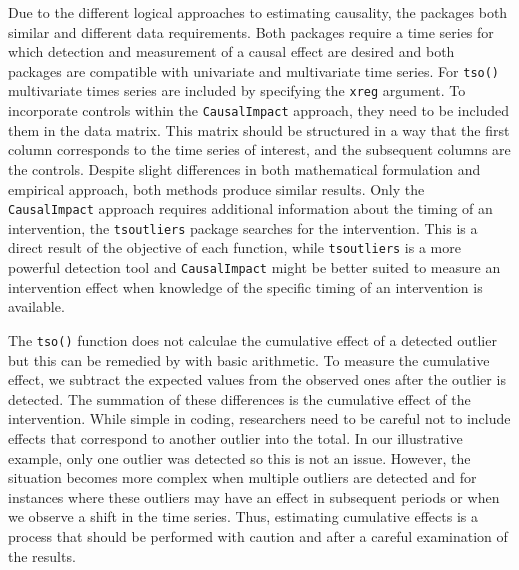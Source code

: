 \documentclass[12pt]{article}
\begin{document}
Due to the different logical approaches to estimating causality, the
packages both similar and different data requirements. Both packages
require a time series for which detection and measurement of a causal
effect are desired and both packages are compatible with univariate and
multivariate time series. For \texttt{tso()} multivariate times series
are included by specifying the \texttt{xreg} argument. To incorporate
controls within the \texttt{CausalImpact} approach, they need to be
included them in the data matrix. This matrix should be structured in a
way that the first column corresponds to the time series of interest,
and the subsequent columns are the controls. Despite slight differences
in both mathematical formulation and empirical approach, both methods
produce similar results. Only the \texttt{CausalImpact} approach
requires additional information about the timing of an intervention, the
\texttt{tsoutliers} package searches for the intervention. This is a
direct result of the objective of each function, while
\texttt{tsoutliers} is a more powerful detection tool and
\texttt{CausalImpact} might be better suited to measure an intervention
effect when knowledge of the specific timing of an intervention is
available.

The \texttt{tso()} function does not calculae the cumulative effect of a
detected outlier but this can be remedied by with basic arithmetic. To
measure the cumulative effect, we subtract the expected values from the
observed ones after the outlier is detected. The summation of these
differences is the cumulative effect of the intervention. While simple
in coding, researchers need to be careful not to include effects that
correspond to another outlier into the total. In our illustrative
example, only one outlier was detected so this is not an issue. However,
the situation becomes more complex when multiple outliers are detected
and for instances where these outliers may have an effect in subsequent
periods or when we observe a shift in the time series. Thus, estimating
cumulative effects is a process that should be performed with caution
and after a careful examination of the results.
\end{document}

